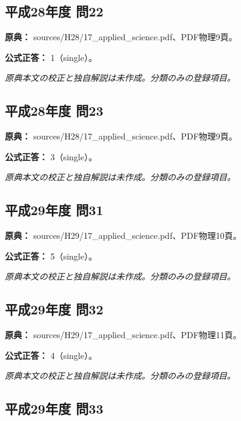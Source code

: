\subsection{平成28年度 問22}
\label{q:h28-reg-applied-22}

\noindent\textbf{原典：} sources/H28/17\_applied\_science.pdf、PDF物理9頁。

\textbf{公式正答：} 1（single）。

\par\textit{原典本文の校正と独自解説は未作成。分類のみの登録項目。}

\subsection{平成28年度 問23}
\label{q:h28-reg-applied-23}

\noindent\textbf{原典：} sources/H28/17\_applied\_science.pdf、PDF物理9頁。

\textbf{公式正答：} 3（single）。

\par\textit{原典本文の校正と独自解説は未作成。分類のみの登録項目。}

\subsection{平成29年度 問31}
\label{q:h29-reg-applied-31}

\noindent\textbf{原典：} sources/H29/17\_applied\_science.pdf、PDF物理10頁。

\textbf{公式正答：} 5（single）。

\par\textit{原典本文の校正と独自解説は未作成。分類のみの登録項目。}

\subsection{平成29年度 問32}
\label{q:h29-reg-applied-32}

\noindent\textbf{原典：} sources/H29/17\_applied\_science.pdf、PDF物理11頁。

\textbf{公式正答：} 4（single）。

\par\textit{原典本文の校正と独自解説は未作成。分類のみの登録項目。}

\subsection{平成29年度 問33}
\label{q:h29-reg-applied-33}

